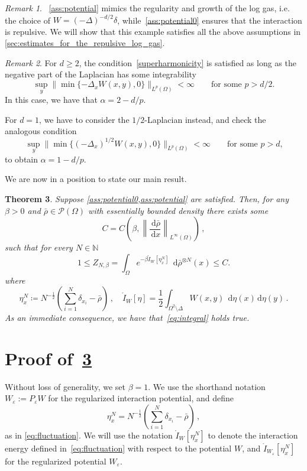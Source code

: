 \documentclass[a4paper,10pt,twoside]{amsart}
\newcommand{\dx}[1]{\,\mathrm{d}#1}  %
\newtheorem{theorem}{Theorem}[section]
\theoremstyle{remark}
\newtheorem{remark}[theorem]{Remark}
\theoremstyle{definition}
\numberwithin{equation}{section}
\newcommand{\eps}{\varepsilon}
\newcommand{\N}{\mathbb{N}}
\newcommand{\cP}{\mathcal{P}}
\newcommand{\0}{{\bf 0}}
\newcommand{\+}{\hspace{-.5ex}+\hspace{-.5ex}}
\begin{document}
\begin{remark}
  ~\cref{ass:potential} mimics the regularity and growth of the log gas, i.e. the choice of $W=(-\Delta)^{-d/2}\delta$, while~\cref{ass:potential0} ensures that the interaction is repulsive. We will show that this example satisfies all the above assumptions in \cref{sec:estimates_for_the_repulsive_log_gas}.
\end{remark}
\begin{remark}
    For $d\ge 2$, the condition~\eqref{superharmonicity} is satisfied as long as the negative part of the Laplacian has some  integrability
    $$
    \sup_y\|\min\{-\Delta_x W(x,y),0\}\|_{L^p(\Omega)}<\infty \qquad\mbox{for some $p>d/2$.}
    $$
    In this case, we have that $\alpha=2-d/p$. 
    
    For $d=1$, we have to consider the $1/2$-Laplacian instead, and check the analogous condition
    $$
    \sup_y\|\min\{(-\Delta_x)^{1/2} W(x,y),0\}\|_{L^p(\Omega)}<\infty \qquad\mbox{for some $p>d$,}
    $$
    to obtain $\alpha=1-d/p$.
\end{remark}

We are now in a position to state our main result.

\begin{theorem}\label{thm:main}
  Suppose \cref{ass:potential0,ass:potential} are satisfied. Then, for any $\beta>0$ and $\bar{\rho}\in \cP(\Omega)$ with essentially bounded density there exists some
\[
  C=C\left(\beta,\left \lVert\frac{\dx{\bar{\rho}}}{\dx{x}} \right \rVert_{L^\infty(\Omega)}\right) \, ,
\]
such that for every $N\in\N$
  \begin{equation}
    1\le Z_{N,\beta}=\int_{\Omega}e^{-\beta\mathring{I}_W[\eta^N_x]}\;\dx\bar\rho^{\otimes N}(x)\le C.
  \end{equation}
  where 
  \begin{equation}
  \eta^N_x \coloneqq N^{-\frac12}\left(\sum_{i=1}^N \delta_{x_i}-\bar{\rho}\right) \, , \quad \mathring{I}_W[\eta]=\frac{1}{2}\int_{\Omega^2\setminus \Delta} W(x,y)\;\dx\eta(x)\dx\eta(y)\, .
\end{equation}
As an immediate consequence, we have that~\eqref{eq:integral} holds true. 
\end{theorem}

\section{Proof of~\cref{thm:main}} %
\label{sec:proofs}
Without loss of generality, we set $\beta=1$. We use the shorthand notation $W_\eps:=P_\eps W$ for the regularized interaction potential, and define
\begin{equation}
  \eta^N_x= N^{-\frac12}\left(\sum_{i=1}^N \delta_{x_i}-\bar\rho\right)\, ,
\end{equation}
as in \eqref{eq:fluctuation}. We will use the notation $\mathring{I}_W[\eta^N_x]$ to denote the interaction energy defined in~\eqref{eq:fluctuation} with respect to the potential $W$, and $\mathring{I}_{W_\eps}[\eta^N_x]$ for the regularized potential $W_\eps$.
\end{document}
